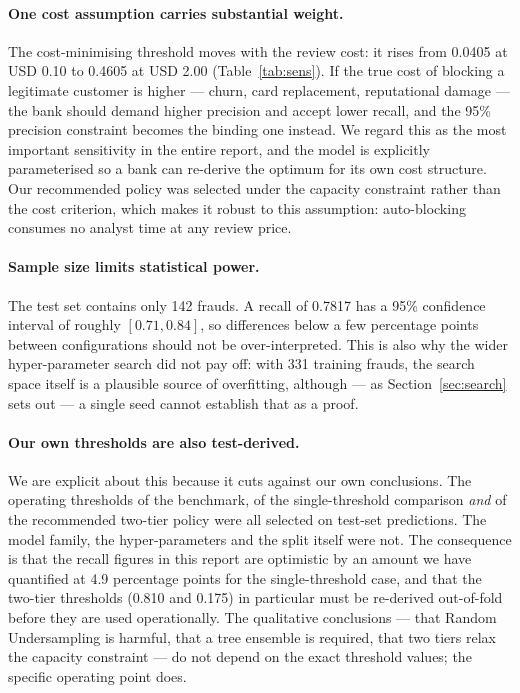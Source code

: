 \paragraph*{One cost assumption carries substantial weight.} The
cost-minimising threshold moves with the review cost: it rises from 0.0405 at
USD 0.10 to 0.4605 at USD 2.00 (Table~\ref{tab:sens}). If the true cost of
blocking a legitimate customer is higher --- churn, card replacement,
reputational damage --- the bank should demand higher precision and accept
lower recall, and the 95\% precision constraint becomes the binding one
instead. We regard this as the most important sensitivity in the entire report,
and the model is explicitly parameterised so a bank can re-derive the optimum
for its own cost structure. Our recommended policy was selected under the
capacity constraint rather than the cost criterion, which makes it robust to
this assumption: auto-blocking consumes no analyst time at any review price.

\paragraph*{Sample size limits statistical power.} The test set contains only 142
frauds. A recall of 0.7817 has a 95\% confidence interval of roughly
$[0.71, 0.84]$, so differences below a few percentage points between
configurations should not be over-interpreted. This is also why the wider
hyper-parameter search did not pay off: with 331 training frauds, the search
space itself is a plausible source of overfitting, although --- as
Section~\ref{sec:search} sets out --- a single seed cannot establish that as a
proof.

\paragraph*{Our own thresholds are also test-derived.} We are explicit about
this because it cuts against our own conclusions. The operating thresholds of
the benchmark, of the single-threshold comparison \emph{and} of the
recommended two-tier policy were all selected on test-set predictions. The
model family, the hyper-parameters and the split itself were not. The
consequence is that the recall figures in this report are optimistic by an
amount we have quantified at 4.9 percentage points for the single-threshold
case, and that the two-tier thresholds (0.810 and 0.175) in particular must be
re-derived out-of-fold before they are used operationally. The qualitative
conclusions --- that Random Undersampling is harmful, that a tree ensemble is
required, that two tiers relax the capacity constraint --- do not depend on
the exact threshold values; the specific operating point does.

